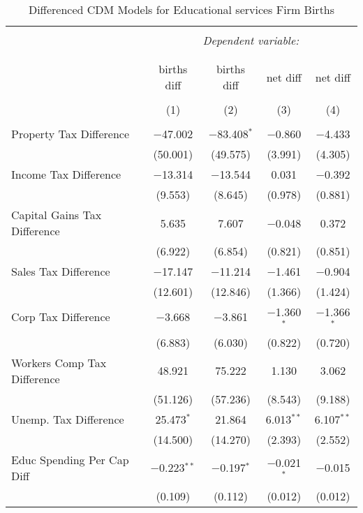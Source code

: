 
\begin{table}[!htbp] \centering 
  \caption{Differenced CDM Models for  Educational services Firm Births} 
  \label{} 
\begin{tabular}{@{\extracolsep{5pt}}lcccc} 
\\[-1.8ex]\hline 
\hline \\[-1.8ex] 
 & \multicolumn{4}{c}{\textit{Dependent variable:}} \\ 
\cline{2-5} 
\\[-1.8ex] & \multicolumn{4}{c}{ } \\ 
 & births diff & births diff & net diff & net diff \\ 
\\[-1.8ex] & (1) & (2) & (3) & (4)\\ 
\hline \\[-1.8ex] 
 Property Tax Difference & $-$47.002 & $-$83.408$^{*}$ & $-$0.860 & $-$4.433 \\ 
  & (50.001) & (49.575) & (3.991) & (4.305) \\ 
  Income Tax Difference & $-$13.314 & $-$13.544 & 0.031 & $-$0.392 \\ 
  & (9.553) & (8.645) & (0.978) & (0.881) \\ 
  Capital Gains Tax Difference & 5.635 & 7.607 & $-$0.048 & 0.372 \\ 
  & (6.922) & (6.854) & (0.821) & (0.851) \\ 
  Sales Tax Difference & $-$17.147 & $-$11.214 & $-$1.461 & $-$0.904 \\ 
  & (12.601) & (12.846) & (1.366) & (1.424) \\ 
  Corp Tax Difference & $-$3.668 & $-$3.861 & $-$1.360$^{*}$ & $-$1.366$^{*}$ \\ 
  & (6.883) & (6.030) & (0.822) & (0.720) \\ 
  Workers Comp Tax Difference & 48.921 & 75.222 & 1.130 & 3.062 \\ 
  & (51.126) & (57.236) & (8.543) & (9.188) \\ 
  Unemp. Tax Difference & 25.473$^{*}$ & 21.864 & 6.013$^{**}$ & 6.107$^{**}$ \\ 
  & (14.500) & (14.270) & (2.393) & (2.552) \\ 
  Educ Spending Per Cap Diff & $-$0.223$^{**}$ & $-$0.197$^{*}$ & $-$0.021$^{*}$ & $-$0.015 \\ 
  & (0.109) & (0.112) & (0.012) & (0.012) \\ 

\end{tabular}
\end{table}
